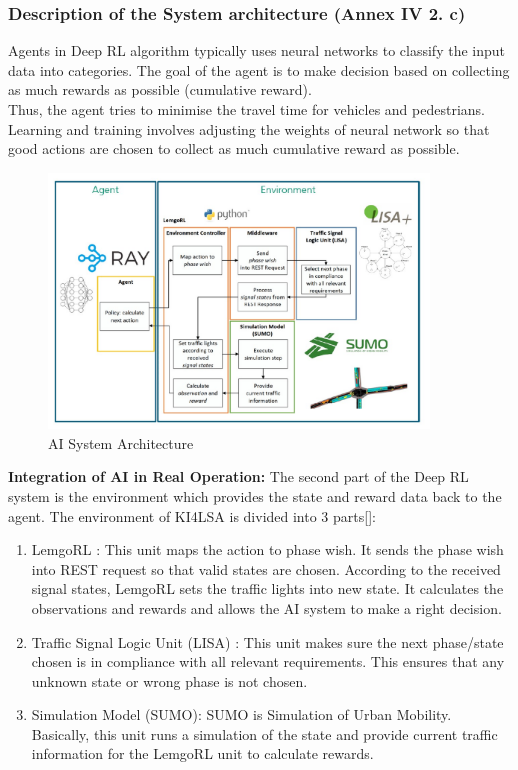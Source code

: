  \subsubsection{Description of the System architecture (Annex IV 2. c)}
  Agents in Deep RL algorithm typically uses neural networks to classify the input data into categories. The goal of the agent is to make decision based on collecting as much rewards as possible (cumulative reward). \\
Thus, the agent tries to minimise the travel time for vehicles and pedestrians. Learning and training involves adjusting the weights of neural network so that good actions are chosen to collect as much cumulative reward as possible.\\
 \begin{figure}[h]
        \includegraphics[width=0.9\textwidth]{paper-template/figs/sytemarchitecture.jpg}
        \caption{AI System Architecture}
        \label{fig:my_label}
        \end{figure} \newline
\textbf {Integration of AI in Real Operation:}\newline
The second part of the Deep RL system is the environment which provides the state and reward data back to the agent. The environment of KI4LSA is divided into 3 parts[\citet{KI4LSA_presentation}]:
\begin{enumerate}
\item 	LemgoRL : This unit maps the action to phase wish. It sends the phase wish into REST request so that valid states are chosen. According to the received signal states, LemgoRL sets the traffic lights into new state. It calculates the observations and rewards and allows the AI system to make a right decision.
\item Traffic Signal Logic Unit (LISA) : This unit makes sure the next phase/state chosen is in compliance with all relevant requirements. This ensures that any unknown state or wrong phase is not chosen.
\item Simulation Model (SUMO): SUMO is Simulation of Urban Mobility. Basically, this unit runs a simulation of the state and provide current traffic information for the LemgoRL unit to calculate rewards.
\end{enumerate}
 

